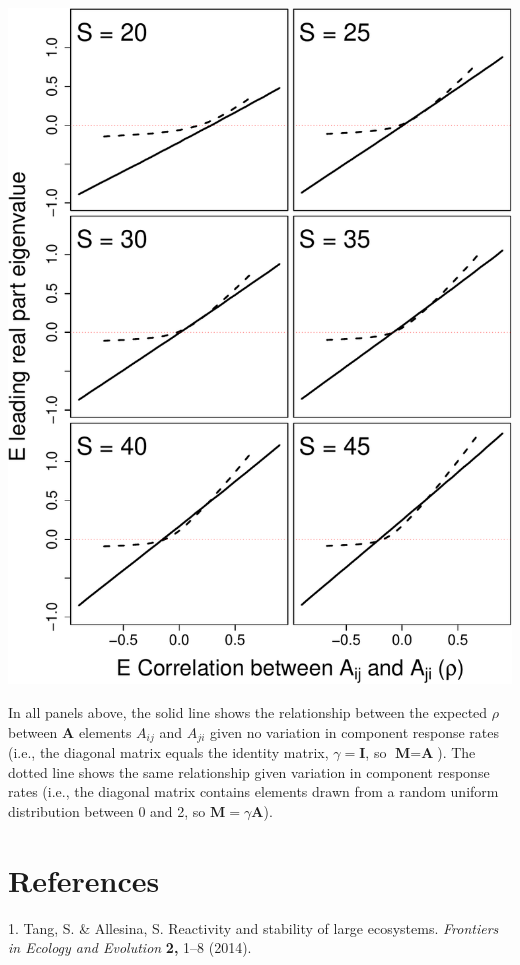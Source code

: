 \documentclass[]{article}
\begin{document}
\includegraphics{revision_notes_files/figure-latex/unnamed-chunk-13-1.pdf}

In all panels above, the solid line shows the relationship between the
expected \(\rho\) between \(\textbf{A}\) elements \(A_{ij}\) and
\(A_{ji}\) given no variation in component response rates (i.e., the
diagonal matrix equals the identity matrix, \(\gamma = \textbf{I}\), so
\(\textbf{M} = \textbf{A}\)). The dotted line shows the same
relationship given variation in component response rates (i.e., the
diagonal matrix contains elements drawn from a random uniform
distribution between 0 and 2, so \(\textbf{M} = \gamma\textbf{A}\)).

\section*{References}\label{references}

\hypertarget{refs}{}
\hypertarget{ref-Tang2014b}{}
1. Tang, S. \& Allesina, S. Reactivity and stability of large
ecosystems. \emph{Frontiers in Ecology and Evolution} \textbf{2,} 1--8
(2014).
\end{document}
